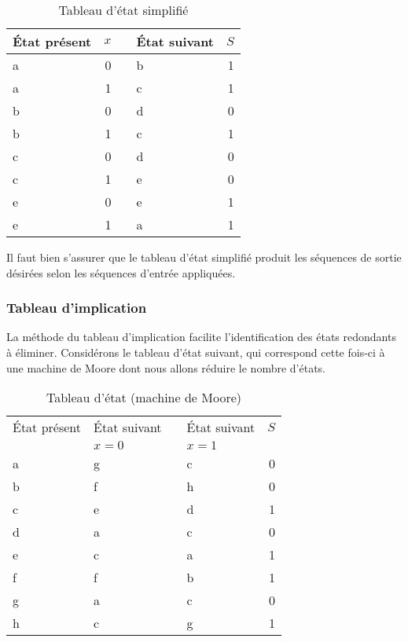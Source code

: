 \documentclass[11pt]{article}
\begin{document}
\begin{table}[htbp]
\caption{\label{tab:orgf820d9c}Tableau d'état simplifié}
\centering
\begin{tabular}{lrllr}
État présent & \(x\) &  & État suivant & \(S\)\\[0pt]
\hline
a & 0 &  & b & 1\\[0pt]
a & 1 &  & c & 1\\[0pt]
b & 0 &  & d & 0\\[0pt]
b & 1 &  & c & 1\\[0pt]
c & 0 &  & d & 0\\[0pt]
c & 1 &  & e & 0\\[0pt]
e & 0 &  & e & 1\\[0pt]
e & 1 &  & a & 1\\[0pt]
\end{tabular}
\end{table}

Il faut bien s'assurer que le tableau d'état simplifié produit les
séquences de sortie désirées selon les séquences d'entrée appliquées.

\subsubsection{Tableau d'implication}
\label{sec:org968865f}

La méthode du tableau d'implication facilite l'identification des
états redondants à éliminer. Considérons le tableau d'état suivant,
qui correspond cette fois-ci à une machine de Moore dont nous allons
réduire le nombre d'états.

\begin{table}[htbp]
\caption{\label{tab:org3046be6}Tableau d'état (machine de Moore)}
\centering
\begin{tabular}{llllr}
État présent & État suivant &  & État suivant & \(S\)\\[0pt]
 & \(x=0\) &  & \(x=1\) & \\[0pt]
\hline
a & g &  & c & 0\\[0pt]
b & f &  & h & 0\\[0pt]
c & e &  & d & 1\\[0pt]
d & a &  & c & 0\\[0pt]
e & c &  & a & 1\\[0pt]
f & f &  & b & 1\\[0pt]
g & a &  & c & 0\\[0pt]
h & c &  & g & 1\\[0pt]
\end{tabular}
\end{table}
\end{document}
